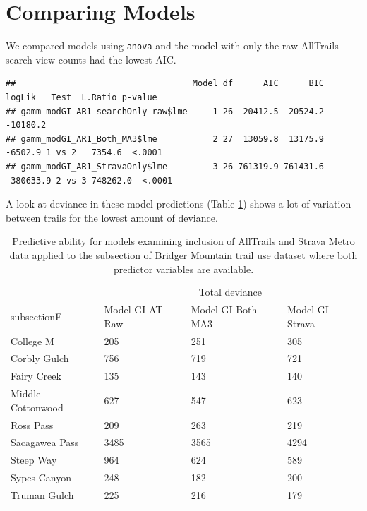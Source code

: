 \documentclass[
]{book}
\begin{document}
\hypertarget{comparing-models}{%
\section{Comparing Models}\label{comparing-models}}

We compared models using \texttt{anova} and the model with only the raw AllTrails search view counts had the lowest AIC.

\begin{verbatim}
##                                   Model df      AIC      BIC    logLik   Test  L.Ratio p-value
## gamm_modGI_AR1_searchOnly_raw$lme     1 26  20412.5  20524.2  -10180.2                        
## gamm_modGI_AR1_Both_MA3$lme           2 27  13059.8  13175.9   -6502.9 1 vs 2   7354.6  <.0001
## gamm_modGI_AR1_StravaOnly$lme         3 26 761319.9 761431.6 -380633.9 2 vs 3 748262.0  <.0001
\end{verbatim}

A look at deviance in these model predictions (Table \ref{tab:ATdeviance-kable}) shows a lot of variation between trails for the lowest amount of deviance.

\begin{table}

\caption{\label{tab:ATdeviance-kable}Predictive ability for models examining inclusion of AllTrails and Strava Metro data applied to the subsection of Bridger Mountain trail use dataset where both predictor variables are available.}
\centering
\begin{tabular}[t]{llll}
\toprule
\multicolumn{1}{c}{ } & \multicolumn{3}{c}{Total deviance} \\
\cmidrule(l{3pt}r{3pt}){2-4}
subsectionF & Model GI-AT-Raw & Model GI-Both-MA3 & Model GI-Strava\\
\midrule
College M & 205 & 251 & 305\\
Corbly Gulch & 756 & 719 & 721\\
Fairy Creek & 135 & 143 & 140\\
Middle Cottonwood & 627 & 547 & 623\\
Ross Pass & 209 & 263 & 219\\
\addlinespace
Sacagawea Pass & 3485 & 3565 & 4294\\
Steep Way & 964 & 624 & 589\\
Sypes Canyon & 248 & 182 & 200\\
Truman Gulch & 225 & 216 & 179\\
\bottomrule
\end{tabular}
\end{table}
\end{document}

